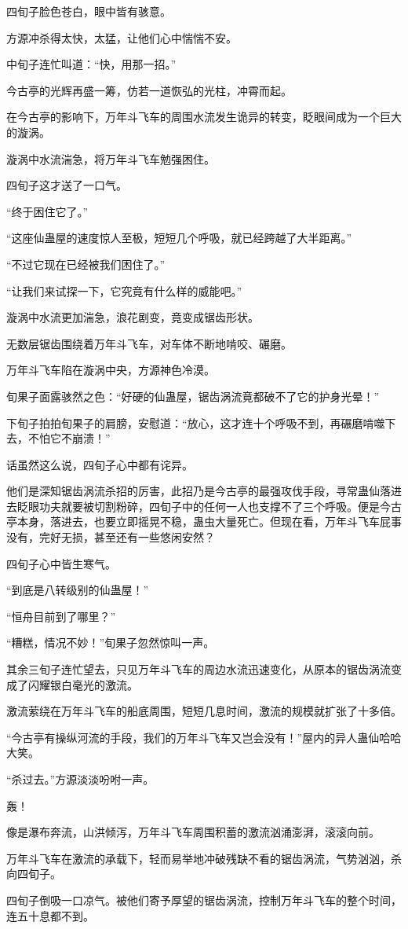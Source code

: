 \begin{this_body}
四旬子脸色苍白，眼中皆有骇意。

方源冲杀得太快，太猛，让他们心中惴惴不安。

中旬子连忙叫道：“快，用那一招。”

今古亭的光辉再盛一筹，仿若一道恢弘的光柱，冲霄而起。

在今古亭的影响下，万年斗飞车的周围水流发生诡异的转变，眨眼间成为一个巨大的漩涡。

漩涡中水流湍急，将万年斗飞车勉强困住。

四旬子这才送了一口气。

“终于困住它了。”

“这座仙蛊屋的速度惊人至极，短短几个呼吸，就已经跨越了大半距离。”

“不过它现在已经被我们困住了。”

“让我们来试探一下，它究竟有什么样的威能吧。”

漩涡中水流更加湍急，浪花剧变，竟变成锯齿形状。

无数层锯齿围绕着万年斗飞车，对车体不断地啃咬、碾磨。

万年斗飞车陷在漩涡中央，方源神色冷漠。

旬果子面露骇然之色：“好硬的仙蛊屋，锯齿涡流竟都破不了它的护身光晕！”

下旬子拍拍旬果子的肩膀，安慰道：“放心，这才连十个呼吸不到，再碾磨啃噬下去，不怕它不崩溃！”

话虽然这么说，四旬子心中都有诧异。

他们是深知锯齿涡流杀招的厉害，此招乃是今古亭的最强攻伐手段，寻常蛊仙落进去眨眼功夫就要被切割粉碎，四旬子中的任何一人也支撑不了三个呼吸。便是今古亭本身，落进去，也要立即摇晃不稳，蛊虫大量死亡。但现在看，万年斗飞车屁事没有，完好无损，甚至还有一些悠闲安然？

四旬子心中皆生寒气。

“到底是八转级别的仙蛊屋！”

“恒舟目前到了哪里？”

“糟糕，情况不妙！”旬果子忽然惊叫一声。

其余三旬子连忙望去，只见万年斗飞车的周边水流迅速变化，从原本的锯齿涡流变成了闪耀银白毫光的激流。

激流萦绕在万年斗飞车的船底周围，短短几息时间，激流的规模就扩张了十多倍。

“今古亭有操纵河流的手段，我们的万年斗飞车又岂会没有！”屋内的异人蛊仙哈哈大笑。

“杀过去。”方源淡淡吩咐一声。

轰！

像是瀑布奔流，山洪倾泻，万年斗飞车周围积蓄的激流汹涌澎湃，滚滚向前。

万年斗飞车在激流的承载下，轻而易举地冲破残缺不看的锯齿涡流，气势汹汹，杀向四旬子。

四旬子倒吸一口凉气。被他们寄予厚望的锯齿涡流，控制万年斗飞车的整个时间，连五十息都不到。

\end{this_body}

